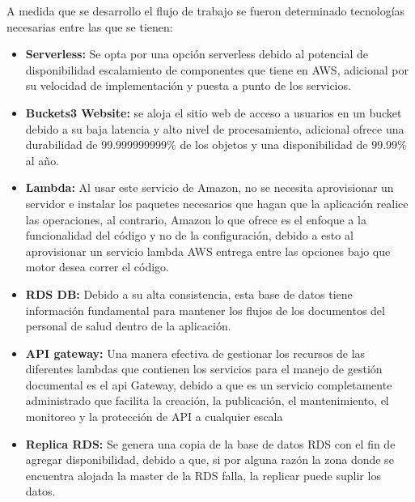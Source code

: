 \documentclass{article}
\begin{document}
\newpage


A medida que se desarrollo el flujo de trabajo se fueron determinado tecnologías necesarias entre las que se tienen:

\begin{itemize}
    \item \textbf{Serverless:} Se opta por una opción serverless debido al potencial de disponibilidad escalamiento de componentes que tiene en AWS, adicional por su velocidad de implementación y puesta a punto de los servicios. \cite{3}
    \item \textbf{Buckets3 Website:} se aloja el sitio web de acceso a usuarios en un bucket debido a su baja latencia y alto nivel de procesamiento, adicional ofrece una durabilidad de 99.999999999\% de los objetos y una disponibilidad de 99.99\% al año.\cite{3}
    
    \item \textbf{Lambda:} Al usar este servicio de Amazon, no se necesita aprovisionar un servidor e instalar los paquetes necesarios que hagan que la aplicación realice las operaciones, al contrario, Amazon lo que ofrece es el enfoque a la funcionalidad del código y no de la configuración, debido a esto al aprovisionar un servicio lambda AWS entrega entre las opciones bajo que motor desea correr el código.\cite{3}
    \item \textbf{RDS DB:} Debido a su alta consistencia, esta base de datos tiene  información fundamental para mantener los flujos de los documentos del personal de salud dentro de la aplicación.
    
    \item \textbf{API gateway:} Una manera efectiva de gestionar los recursos de las diferentes lambdas que contienen los servicios para el manejo de gestión documental es el api Gateway, debido a que es un servicio completamente administrado que facilita la creación, la publicación, el mantenimiento, el monitoreo y la protección de API a cualquier escala
    
   
     
    \item \textbf{Replica RDS:} Se genera una copia de la base de datos RDS con el fin de agregar disponibilidad, debido a que, si por alguna razón la zona donde se encuentra alojada la master de la RDS falla, la replicar  puede suplir los datos. 

    
\end{itemize}
\end{document}
